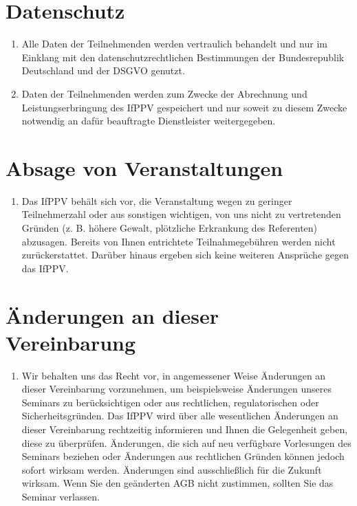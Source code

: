 \documentclass[a4paper, 12pt]{scrartcl}
\begin{document}
    \section{Datenschutz}
    \begin{enumerate}
        \item Alle Daten der Teilnehmenden werden vertraulich behandelt und nur im Einklang mit den datenschutzrechtlichen Bestimmungen der Bundesrepublik Deutschland und der DSGVO genutzt.

        \item Daten der Teilnehmenden werden zum Zwecke der Abrechnung und Leistungserbringung des IfPPV gespeichert und nur soweit zu diesem Zwecke notwendig an daf\"ur beauftragte Dienstleister weitergegeben.
    \end{enumerate}
    
    \section{Absage von Veranstaltungen}
    \begin{enumerate}
        \item Das IfPPV beh\"alt sich vor, die Veranstaltung wegen zu geringer Teilnehmerzahl oder aus sonstigen wichtigen, von uns nicht zu vertretenden Gr\"unden (z. B. h\"ohere Gewalt, pl\"otzliche Erkrankung des Referenten) abzusagen.
        Bereits von Ihnen entrichtete Teilnahmegeb\"uhren werden nicht zur\"uckerstattet.
        Dar\"uber hinaus ergeben sich keine weiteren Anspr\"uche gegen das IfPPV.
    \end{enumerate}

    \section{\"Anderungen an dieser Vereinbarung}
    \begin{enumerate}
        \item Wir behalten uns das Recht vor, in angemessener Weise \"Anderungen an dieser Vereinbarung vorzunehmen, um beispielsweise \"Anderungen unseres Seminars zu ber\"ucksichtigen oder aus rechtlichen, regulatorischen oder Sicherheitsgr\"unden.
        Das IfPPV wird \"uber alle wesentlichen \"Anderungen an dieser Vereinbarung rechtzeitig informieren und Ihnen die Gelegenheit geben, diese zu \"uberpr\"ufen.
        \"Anderungen, die sich auf neu verf\"ugbare Vorlesungen des Seminars beziehen oder \"Anderungen aus rechtlichen Gr\"unden k\"onnen jedoch sofort wirksam werden.
        \"Anderungen sind ausschließlich f\"ur die Zukunft wirksam.
        Wenn Sie den ge\"anderten AGB nicht zustimmen, sollten Sie das Seminar verlassen.
    \end{enumerate}
\end{document}
